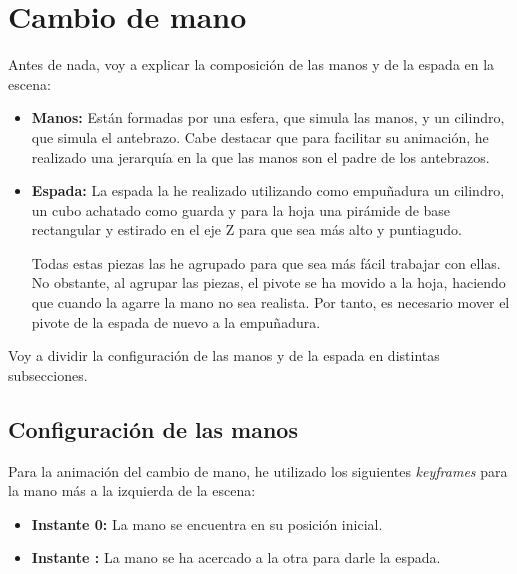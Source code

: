 
\section{Cambio de mano}

Antes de nada, voy a explicar la composición de las manos y de la espada en la escena:

\begin{itemize}
    \item \textbf{Manos: }Están formadas por una esfera, que simula las manos, y un cilindro, que simula el antebrazo. Cabe destacar que para facilitar su animación, he realizado una jerarquía en la que las manos son el padre de los antebrazos.
    
    \item \textbf{Espada: }La espada la he realizado utilizando como empuñadura un cilindro, un cubo achatado como guarda y para la hoja una pirámide de base rectangular y estirado en el eje Z para que sea más alto y puntiagudo.
    
    \bigskip

    Todas estas piezas las he agrupado para que sea más fácil trabajar con ellas. No obstante, al agrupar las piezas, el pivote se ha movido a la hoja, haciendo que cuando la agarre la mano no sea realista. Por tanto, es necesario mover el pivote de la espada de nuevo a la empuñadura.
    
\end{itemize}

Voy a dividir la configuración de las manos y de la espada en distintas subsecciones.

\subsection{Configuración de las manos}

Para la animación del cambio de mano, he utilizado los siguientes \textit{keyframes} para la mano más a la izquierda de la escena:

\begin{itemize}
    \item \textbf{Instante 0: }La mano se encuentra en su posición inicial.
    \item \textbf{Instante : }La mano se ha acercado a la otra para darle la espada.
\end{itemize}


